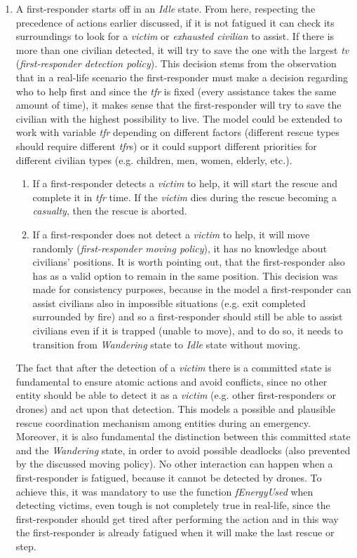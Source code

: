 \begin{enumerate}
	\item A first-responder starts off in an \textit{Idle} state. From here, respecting the precedence of actions earlier discussed, if it is not fatigued it can check its surroundings to look for a \textit{victim} or \textit{exhausted civilian} to assist. If there is more than one civilian detected, it will try to save the one with the largest \textit{tv} (\textit{first-responder detection policy}). This decision stems from the observation that in a real-life scenario the first-responder must make a decision regarding who to help first and since the \textit{tfr} is fixed (every assistance takes the same amount of time), it makes sense that the first-responder will try to save the civilian with the highest possibility to live. The model could be extended to work with variable \textit{tfr} depending on different factors (different rescue types should require different \textit{tfr}s) or it could support different priorities for different civilian types (e.g. children, men, women, elderly, etc.).
	\begin{enumerate}
		\item If a first-responder detects a \textit{victim} to help, it will start the rescue and complete it in \textit{tfr} time. If the \textit{victim} dies during the rescue becoming a \textit{casualty}, then the rescue is aborted.
		\item If a first-responder does not detect a \textit{victim} to help, it will move randomly (\textit{first-responder moving policy}), it has no knowledge about civilians' positions. It is worth pointing out, that the first-responder also has as a valid option to remain in the same position. This decision was made for consistency purposes, because in the model a first-responder can assist civilians also in impossible situations (e.g. exit completed surrounded by fire) and so a first-responder should still be able to assist civilians even if it is trapped (unable to move), and to do so, it needs to transition from \textit{Wandering} state to \textit{Idle} state without moving.
	\end{enumerate}
	The fact that after the detection of a \textit{victim} there is a committed state is fundamental to ensure atomic actions and avoid conflicts, since no other entity should be able to detect it as a \textit{victim} (e.g. other first-responders or drones) and act upon that detection. This models a possible and plausible rescue coordination mechanism among entities during an emergency.\newline
	Moreover, it is also fundamental the distinction between this committed state and the \textit{Wandering} state, in order to avoid possible deadlocks (also prevented by the discussed moving policy).\newline
	No other interaction can happen when a first-responder is fatigued, because it cannot be detected by drones. To achieve this, it was mandatory to use the function \textit{fEnergyUsed} when detecting victims, even tough is not completely true in real-life, since the first-responder should get tired after performing the action and in this way the first-responder is already fatigued when it will make the last rescue or step.
	

\end{enumerate}
